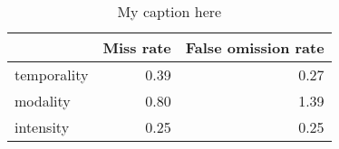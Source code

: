 \begin{table}[!ht]
\centering
\begin{tabular}{lrr}
\toprule
{} &  Miss rate &  False omission rate \\
\midrule
temporality &       0.39 &                 0.27 \\
modality    &       0.80 &                 1.39 \\
intensity   &       0.25 &                 0.25 \\
\bottomrule
\end{tabular}
\caption{My caption here}
\label{tab:MOOD_ASSESMENT-ocd-combined-errors}
\end{table}
